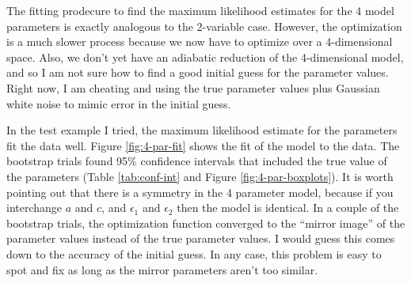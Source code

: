 \documentclass{article}
\begin{document}
The fitting prodecure to find the maximum likelihood estimates for the
4 model parameters is exactly analogous to the 2-variable
case. However, the optimization is a much slower process because we
now have to optimize over a 4-dimensional space. Also, we don't yet
have an adiabatic reduction of the 4-dimensional model, and so I am
not sure how to find a good initial guess for the parameter
values. Right now, I am cheating and using the true parameter values
plus Gaussian white noise to mimic error in the initial guess.

In the test example I tried, the maximum likelihood estimate for the
parameters fit the data well. Figure \ref{fig:4-par-fit} shows the fit
of the model to the data. The bootstrap trials found 95\% confidence
intervals that included the true value of the parameters (Table
\ref{tab:conf-int} and Figure \ref{fig:4-par-boxplots}). It is worth
pointing out that there is a symmetry in the 4 parameter model,
because if you interchange $a$ and $c$, and $\epsilon_1$ and
$\epsilon_2$ then the model is identical. In a couple of the bootstrap
trials, the optimization function converged to the ``mirror image'' of
the parameter values instead of the true parameter values. I would
guess this comes down to the accuracy of the initial guess. In any
case, this problem is easy to spot and fix as long as the mirror
parameters aren't too similar.
\end{document}
